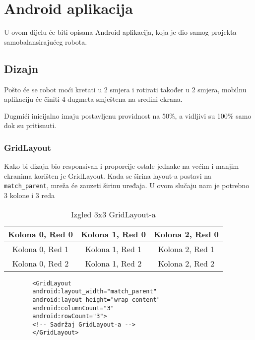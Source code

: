 \documentclass[../Document.tex]{subfiles}
\begin{document}
\section{Android aplikacija}
U ovom dijelu će biti opisana Android aplikacija, koja je dio samog projekta samobalansirajućeg robota.

\subsection{Dizajn}
Pošto će se robot moći kretati u 2 smjera i rotirati također u 2 smjera, mobilnu aplikaciju će činiti 4 dugmeta smještena na sredini ekrana.


\noindent Dugmići inicijalno imaju postavljenu providnost na 50\%, a vidljivi su 100\% samo dok su pritisnuti.

\subsubsection{GridLayout}
Kako bi dizajn bio responsivan i proporcije ostale jednake na većim i manjim ekranima korišten je GridLayout. Kada se širina layout-a postavi na \verb|match_parent|, mreža će zauzeti širinu uređaja. U ovom slučaju nam je potrebno 3 kolone i 3 reda

\begin{table}[h]
    \centering
    \def\arraystretch{2}
    \begin{tabular}{ |c|c|c| }
        \hline
        Kolona 0, Red 0 & Kolona 1, Red 0 & Kolona 2, Red 0 \\
        \hline
        Kolona 0, Red 1 & Kolona 1, Red 1 & Kolona 2, Red 1 \\
        \hline
        Kolona 0, Red 2 & Kolona 1, Red 2 & Kolona 2, Red 2 \\
        \hline
    \end{tabular}
    \caption{Izgled 3x3 GridLayout-a}
\end{table}

\begin{code}
    \begin{verbatim}
        <GridLayout
        android:layout_width="match_parent"
        android:layout_height="wrap_content"
        android:columnCount="3"
        android:rowCount="3">
        <!-- Sadržaj GridLayout-a -->
        </GridLayout>
    \end{verbatim}
    \caption{GridLayout}
\end{code}
\end{document}
